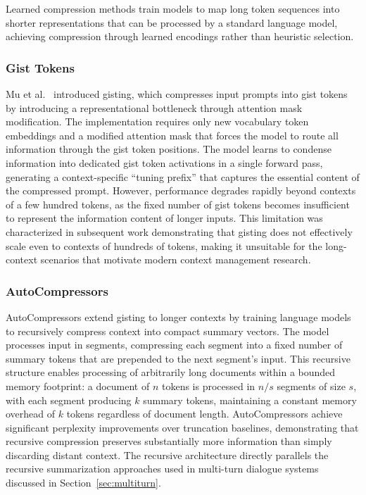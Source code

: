 \documentclass[11pt,letterpaper]{article}
\begin{document}
Learned compression methods train models to map long token sequences into shorter representations that can be processed by a standard language model, achieving compression through learned encodings rather than heuristic selection.

\subsubsection{Gist Tokens}

Mu et al.\ \cite{mu2024learning} introduced gisting, which compresses input prompts into gist tokens by introducing a representational bottleneck through attention mask modification. The implementation requires only new vocabulary token embeddings and a modified attention mask that forces the model to route all information through the gist token positions. The model learns to condense information into dedicated gist token activations in a single forward pass, generating a context-specific ``tuning prefix'' that captures the essential content of the compressed prompt. However, performance degrades rapidly beyond contexts of a few hundred tokens, as the fixed number of gist tokens becomes insufficient to represent the information content of longer inputs. This limitation was characterized in subsequent work demonstrating that gisting does not effectively scale even to contexts of hundreds of tokens, making it unsuitable for the long-context scenarios that motivate modern context management research.

\subsubsection{AutoCompressors}

AutoCompressors \cite{chevalier2023adapting} extend gisting to longer contexts by training language models to recursively compress context into compact summary vectors. The model processes input in segments, compressing each segment into a fixed number of summary tokens that are prepended to the next segment's input. This recursive structure enables processing of arbitrarily long documents within a bounded memory footprint: a document of $n$ tokens is processed in $n/s$ segments of size $s$, with each segment producing $k$ summary tokens, maintaining a constant memory overhead of $k$ tokens regardless of document length. AutoCompressors achieve significant perplexity improvements over truncation baselines, demonstrating that recursive compression preserves substantially more information than simply discarding distant context. The recursive architecture directly parallels the recursive summarization approaches used in multi-turn dialogue systems discussed in Section~\ref{sec:multiturn}.
\end{document}
